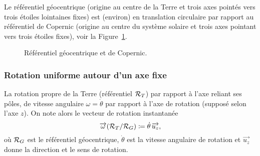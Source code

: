             \begin{example}
                Le référentiel géocentrique (origine au centre de la Terre et trois axes pointés vers trois étoiles lointaines \og fixes\fg) est (environ) en translation circulaire par rapport au référentiel de Copernic (origine au centre du système solaire et trois axes pointant vers trois étoiles \og fixes\fg), voir la Figure~\ref{fig:refentiel_geocentrique_copernic}.
                \begin{figure}[!h]
                    \centering
                    \caption{Référentiel géocentrique et de Copernic.}    
                    \label{fig:refentiel_geocentrique_copernic}
                \end{figure}
            \end{example}

        \subsubsection{Rotation uniforme autour d'un axe fixe}
            
            \begin{example}
                La rotation propre de la Terre (référentiel $\mathcal{R}_{T}$) par rapport à l'axe reliant ses pôles, de vitesse angulaire $\omega=\dot{\theta}$ par rapport à l'axe de rotation (supposé selon l'axe $z$). On note alors le vecteur de rotation instantanée
                \begin{equation}
                    \protect\overrightarrow{{\omega}}(\mathcal{R}_{T}/\mathcal{R}_{G})\coloneqq \dot{\theta}\,\protect\overrightarrow{{u_z}},
                \end{equation}
                où $\mathcal{R}_{G}$ est le référentiel géocentrique, $\dot{\theta}$ est la vitesse angulaire de rotation et $\vec{u_z}$ donne la direction et le sens de rotation.
            \end{example}

